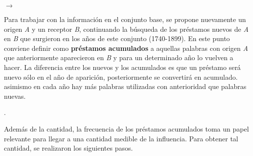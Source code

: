 $\rightarrow$


Para trabajar con la información en el conjunto base, se propone nuevamente un origen \textit{A} y un receptor \textit{B},  continuando la búsqueda de los  préstamos nuevos de \textit{A} en \textit{B} que surgieron en los años de este conjunto (1740-1899).  En este punto conviene definir como \textbf{préstamos acumulados} a aquellas palabras  con origen \textit{A} que anteriormente  aparecieron en  \textit{B} y  para un determinado año lo vuelven a hacer. La diferencia entre los nuevos y los acumulados es que un préstamo será nuevo sólo en el año de aparición, posteriormente se convertirá en acumulado. asimismo en cada año hay más palabras utilizadas con anterioridad que palabras nuevas.  



.  


Además de la cantidad, la frecuencia de los préstamos acumulados toma un papel relevante para llegar a una cantidad medible de la influencia. Para obtener tal cantidad, se realizaron los siguientes pasos.



